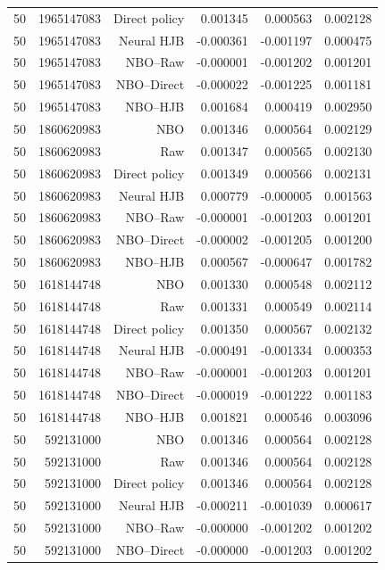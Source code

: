 \begin{longtable}{lrrrrr}
50 & 1965147083 & Direct policy & 0.001345 & 0.000563 & 0.002128 \\
50 & 1965147083 & Neural HJB & -0.000361 & -0.001197 & 0.000475 \\
50 & 1965147083 & NBO--Raw & -0.000001 & -0.001202 & 0.001201 \\
50 & 1965147083 & NBO--Direct & -0.000022 & -0.001225 & 0.001181 \\
50 & 1965147083 & NBO--HJB & 0.001684 & 0.000419 & 0.002950 \\
50 & 1860620983 & NBO & 0.001346 & 0.000564 & 0.002129 \\
50 & 1860620983 & Raw & 0.001347 & 0.000565 & 0.002130 \\
50 & 1860620983 & Direct policy & 0.001349 & 0.000566 & 0.002131 \\
50 & 1860620983 & Neural HJB & 0.000779 & -0.000005 & 0.001563 \\
50 & 1860620983 & NBO--Raw & -0.000001 & -0.001203 & 0.001201 \\
50 & 1860620983 & NBO--Direct & -0.000002 & -0.001205 & 0.001200 \\
50 & 1860620983 & NBO--HJB & 0.000567 & -0.000647 & 0.001782 \\
50 & 1618144748 & NBO & 0.001330 & 0.000548 & 0.002112 \\
50 & 1618144748 & Raw & 0.001331 & 0.000549 & 0.002114 \\
50 & 1618144748 & Direct policy & 0.001350 & 0.000567 & 0.002132 \\
50 & 1618144748 & Neural HJB & -0.000491 & -0.001334 & 0.000353 \\
50 & 1618144748 & NBO--Raw & -0.000001 & -0.001203 & 0.001201 \\
50 & 1618144748 & NBO--Direct & -0.000019 & -0.001222 & 0.001183 \\
50 & 1618144748 & NBO--HJB & 0.001821 & 0.000546 & 0.003096 \\
50 & 592131000 & NBO & 0.001346 & 0.000564 & 0.002128 \\
50 & 592131000 & Raw & 0.001346 & 0.000564 & 0.002128 \\
50 & 592131000 & Direct policy & 0.001346 & 0.000564 & 0.002128 \\
50 & 592131000 & Neural HJB & -0.000211 & -0.001039 & 0.000617 \\
50 & 592131000 & NBO--Raw & -0.000000 & -0.001202 & 0.001202 \\
50 & 592131000 & NBO--Direct & -0.000000 & -0.001203 & 0.001202 \\

\end{longtable}
